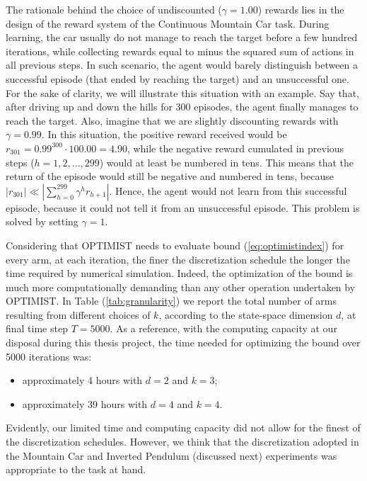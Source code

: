 \begin{remark} \label{rk:undiscounted}
The rationale behind the choice of undiscounted ($\gamma=1.00$) rewards lies in the design of the reward system of the Continuous Mountain Car task. During learning, the car usually do not manage to reach the target before a few hundred iterations, while collecting rewards equal to minus the squared sum of actions in all previous steps. In such scenario, the agent would barely distinguish between a successful episode (that ended by reaching the target) and an unsuccessful one. For the sake of clarity, we will illustrate this situation with an example. Say that, after driving up and down the hills for 300 episodes, the agent finally manages to reach the target. Also, imagine that we are slightly discounting rewards with $\gamma=0.99$. In this situation, the positive reward received would be $r_{301}=0.99^{300}\cdot 100.00=4.90$, while the negative reward cumulated in previous steps ($h=1,2,\dots,299$) would at least be numbered in tens. This means that the return of the episode would still be negative and numbered in tens, because $|r_{301}|\ll |\sum_{h=0}^{299}\gamma^hr_{h+1}|$. Hence, the agent would not learn from this successful episode, because it could not tell it from an unsuccessful episode. This problem is solved by setting $\gamma=1$.
\end{remark}

\begin{remark} \label{rk:discretization}
Considering that \gls{OPTIMIST} needs to evaluate bound (\ref{eq:optimistindex}) for every arm, at each iteration, the finer the discretization schedule the longer the time required by numerical simulation. Indeed, the optimization of the bound is much more computationally demanding than any other operation undertaken by \gls{OPTIMIST}. In Table (\ref{tab:granularity}) we report the total number of arms resulting from different choices of $k$, according to the state-space dimension $d$, at final time step $T=5000$. As a reference, with the computing capacity at our disposal during this thesis project, the time needed for optimizing the bound over 5000 iterations was:

\begin{itemize}
\item approximately 4 hours with $d=2$ and $k=3$;
\item approximately 39 hours with $d=4$ and $k=4$.
\end{itemize} 

Evidently, our limited time and computing capacity did not allow for the finest of the discretization schedules. However, we think that the discretization adopted in the Mountain Car and Inverted Pendulum (discussed next) experiments was appropriate to the task at hand.
\end{remark}

